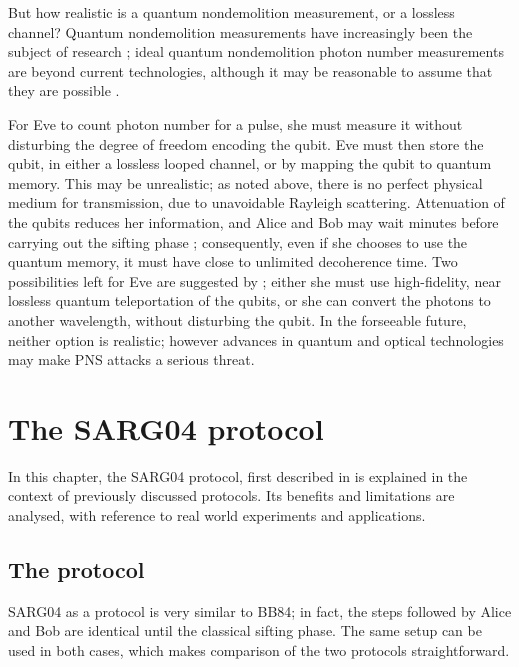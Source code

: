 \documentclass[paper=a4, fontsize=11pt]{scrartcl} %
\numberwithin{equation}{section} %
\numberwithin{figure}{section} %
\numberwithin{table}{section} %
\begin{document}
But how realistic is a quantum nondemolition measurement, or a lossless channel?
Quantum nondemolition measurements have increasingly been the subject of research \citep{brassard2000};
ideal quantum nondemolition photon number measurements are beyond current technologies, although it may
be reasonable to assume that they are possible \citep{reviewScariani, nogues1999}.

For Eve to count photon number for a pulse, she must measure it without disturbing the degree of
freedom encoding the qubit. Eve must then store the qubit, in either a lossless looped
channel, or by mapping the qubit to quantum memory. This may be unrealistic;
as noted above, there is no perfect physical medium
for transmission, due to unavoidable Rayleigh scattering.
Attenuation of the qubits reduces her information, and Alice and Bob
may wait minutes before carrying out the sifting phase \citep{reviewScariani}; consequently, even if she chooses to
use the quantum memory, it must have close to unlimited decoherence time. Two possibilities left for Eve are suggested
by \citet{gisin2002}; either she must use high-fidelity, near lossless quantum teleportation of the qubits, or
she can convert the photons to another wavelength, without disturbing the qubit. In the forseeable future,
neither option is realistic; however advances in quantum and optical technologies may make PNS attacks a serious threat.



\clearpage
\section{The SARG04 protocol}
In this chapter, the SARG04 protocol, first described in \citet{SARG04orig} is explained in the context of previously discussed protocols.
Its benefits and limitations are analysed, with reference to real world experiments and applications.

\subsection{The protocol}
SARG04 as a protocol is very similar to BB84; in fact, the steps followed by Alice and Bob are identical until the classical sifting phase.
The same setup can be used in both cases, which makes comparison of the two protocols straightforward.
\end{document}
